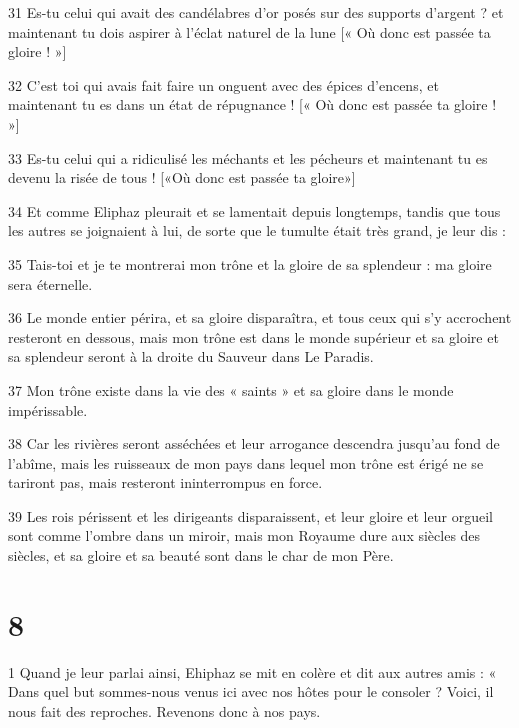 \par 31 Es-tu celui qui avait des candélabres d'or posés sur des supports d'argent ? et maintenant tu dois aspirer à l'éclat naturel de la lune [« Où donc est passée ta gloire ! »]

\par 32 C'est toi qui avais fait faire un onguent avec des épices d'encens, et maintenant tu es dans un état de répugnance ! [« Où donc est passée ta gloire ! »]

\par 33 Es-tu celui qui a ridiculisé les méchants et les pécheurs et maintenant tu es devenu la risée de tous ! [«Où donc est passée ta gloire»]

\par 34 Et comme Eliphaz pleurait et se lamentait depuis longtemps, tandis que tous les autres se joignaient à lui, de sorte que le tumulte était très grand, je leur dis :

\par 35 Tais-toi et je te montrerai mon trône et la gloire de sa splendeur : ma gloire sera éternelle.

\par 36 Le monde entier périra, et sa gloire disparaîtra, et tous ceux qui s'y accrochent resteront en dessous, mais mon trône est dans le monde supérieur et sa gloire et sa splendeur seront à la droite du Sauveur dans Le Paradis.

\par 37 Mon trône existe dans la vie des « saints » et sa gloire dans le monde impérissable.

\par 38 Car les rivières seront asséchées et leur arrogance descendra jusqu'au fond de l'abîme, mais les ruisseaux de mon pays dans lequel mon trône est érigé ne se tariront pas, mais resteront ininterrompus en force.

\par 39 Les rois périssent et les dirigeants disparaissent, et leur gloire et leur orgueil sont comme l'ombre dans un miroir, mais mon Royaume dure aux siècles des siècles, et sa gloire et sa beauté sont dans le char de mon Père.

\chapter{8}

\par 1 Quand je leur parlai ainsi, Ehiphaz se mit en colère et dit aux autres amis : « Dans quel but sommes-nous venus ici avec nos hôtes pour le consoler ? Voici, il nous fait des reproches. Revenons donc à nos pays.

